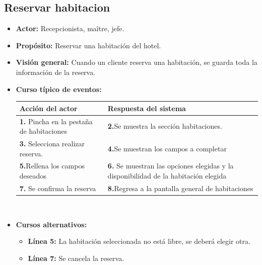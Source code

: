 \documentclass[spanish,a4paper,12pt]{report}	%
\begin{document}
	\subsection{Reservar habitacion}
		\begin{itemize}
			\item \textbf{Actor:} Recepcionista, maître, jefe.
			\item \textbf{Propósito: } Reservar una habitación del hotel.
			\item \textbf{Visión general:} Cuando un cliente reserva una habitación, se guarda toda la información de la reserva.
			\item \textbf{Curso típico de eventos:} 	\\
				\begin{tabular}{|p{6cm}||p{6cm}|}
				\hline
				\textbf{Acción del actor} & \textbf{Respuesta del sistema} \\ \hline
				\textbf{1.} Pincha en la pestaña de habitaciones & \textbf{2.}Se muestra la sección habitaciones.\\ \hline 
				\textbf{3.} Selecciona realizar reserva. & \textbf{4.}Se muestran los campos a completar  \\ \hline
				\textbf{5.}Rellena los campos deseados & \textbf{6.} Se muestran las opciones elegidas y la disponibilidad de la habitación elegida \\ \hline
				\textbf{7.} Se confirma la reserva & \textbf{8.}Regresa a la pantalla general de habitaciones\\ \hline
			\end{tabular}
			\\
			\item \textbf{Cursos alternativos:} 
			\begin{itemize}
			\item  \textbf{Línea 5:} La habitación seleccionada no está libre, se deberá elegir otra.
			\item  \textbf{Línea 7:} Se cancela la reserva. \\
			\end {itemize}
		\end {itemize}

\end{document}
